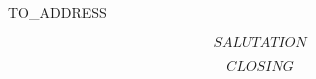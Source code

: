 \documentclass[$$DOCUMENTCLASSOPTIONS$$]{letter}
\begin{document}

\begin{letter}{TO_ADDRESS}
\address{$$ADDRESS$$}

\opening{$$SALUTATION$$}




\signature{$$AUTHOR$$\\$$TITLE$$}

\closing{$$CLOSING$$}


\end{letter}
\end{document}
